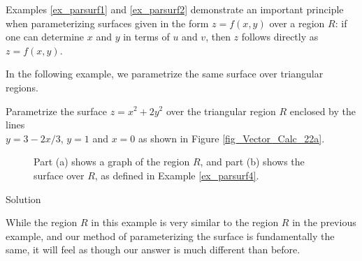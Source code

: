 Examples \ref{ex_parsurf1} and \ref{ex_parsurf2} demonstrate an important principle when parameterizing surfaces given in the form $z=f(x,y)$ over a region $R$: if one can determine $x$ and $y$ in terms of $u$ and $v$, then $z$ follows directly as $z=f(x,y)$. 

In the following example, we parametrize the same surface over triangular regions. 


\begin{example}
\label{ex_parsurf4}
Parametrize the surface $z=x^2+2y^2$ over the triangular region $R$ enclosed by the lines \\ $y=3-2x/3$, $y=1$ and $x=0$ as shown in Figure \ref{fig_Vector_Calc_22a}. 

\begin{figure}[H]
\centering
\qquad
{}
\caption{Part (a) shows a graph of the region $R$, and part (b) shows the surface over $R$, as defined in Example \ref{ex_parsurf4}.}
\end{figure}


\pagebreak
{}Solution 

While the region $R$ in this example is very similar to the region $R$ in the previous example, and our method of parameterizing the surface is fundamentally the same, it will feel as though our answer is much different than before.


\end{example}
